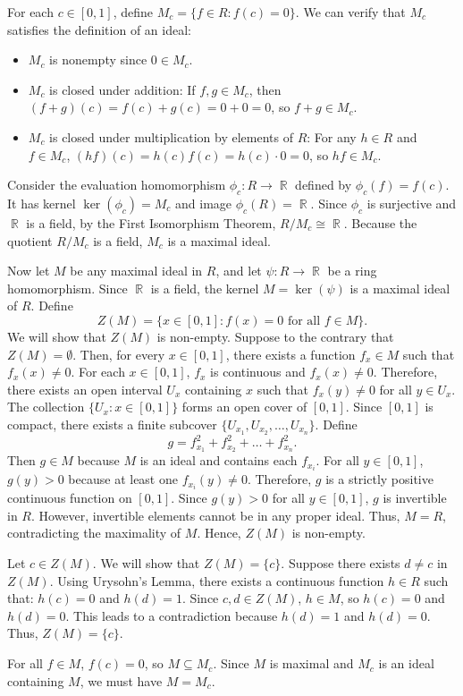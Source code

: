 \documentclass{article}
\DeclareMathOperator{\R}{\mathbb{R}}
\begin{document}
For each \(c\in[0,1]\), define \(M_c=\{f\in R: f(c)= 0\}\). We can verify that \(M_c\) satisfies the definition of an ideal:
\begin{itemize}
    \item \(M_c\) is nonempty since \(0\in M_c\).
    \item \(M_c\) is closed under addition: If \(f,g\in M_c\), then \((f+g)(c)=f(c)+g(c)=0+0=0\), so \(f+g\in M_c\).
    \item \(M_c\) is closed under multiplication by elements of \(R\): For any \(h\in R\) and \(f\in M_c\), \((hf)(c)=h(c)f(c)=h(c)\cdot0=0\), so \(hf\in M_c\).
\end{itemize}

Consider the evaluation homomorphism \(\phi_c:R\to\R\) defined by \(\phi_c(f)= f(c)\). It has kernel \(\ker(\phi_c)=M_c\) and image \(\phi_c(R) = \R\). Since \(\phi_c\) is surjective and \(\R\) is a field, by the First Isomorphism Theorem, \(R/M_c\cong\R\). Because the quotient \(R/M_c\) is a field, \(M_c\) is a maximal ideal.

Now let \(M\) be any maximal ideal in \(R\), and let \(\psi:R\to\R\) be a ring homomorphism. Since \(\R\) is a field, the kernel \(M=\ker(\psi)\) is a maximal ideal of \(R\). Define
\[Z(M)=\{x\in[0,1]:f(x)=0\text{ for all }f\in M\}.\]
We will show that \( Z(M) \) is non-empty. Suppose to the contrary that \(Z(M)=\emptyset\). Then, for every \(x\in[0,1]\), there exists a function \(f_x\in M\) such that \(f_x(x)\neq0\). For each \(x\in[0,1]\), \(f_x\) is continuous and \(f_x(x)\neq0\). Therefore, there exists an open interval \(U_x\) containing \(x\) such that \(f_x(y)\neq0\) for all \(y\in U_x\). The collection \(\{U_x: x\in[0,1]\}\) forms an open cover of \([0,1]\). Since \([0,1]\) is compact, there exists a finite subcover \(\{U_{x_1}, U_{x_2}, \dots, U_{x_n}\}\). Define
\[g = f_{x_1}^2 + f_{x_2}^2 + \dots + f_{x_n}^2.\]
Then \(g\in M\) because \(M\) is an ideal and contains each \(f_{x_i}\). For all \(y\in[0,1]\), \(g(y)>0\) because at least one \(f_{x_i}(y)\neq0\). Therefore, \(g\) is a strictly positive continuous function on \([0,1]\). Since \(g(y)>0 \) for all \(y\in[0,1]\), \(g\) is invertible in \(R\). However, invertible elements cannot be in any proper ideal. Thus, \(M=R\), contradicting the maximality of \(M\). Hence, \(Z(M)\) is non-empty.

Let \(c\in Z(M)\). We will show that \(Z(M)=\{c\}\). Suppose there exists \(d\neq c\) in \(Z(M)\). Using Urysohn's Lemma, there exists a continuous function \(h\in R\) such that: \(h(c)=0\) and \(h(d)=1\). Since \(c,d\in Z(M)\), \(h\in M\), so \(h(c)=0\) and \(h(d)=0\). This leads to a contradiction because \(h(d)=1\) and \(h(d)=0\). Thus, \(Z(M)=\{c\}\).

For all \(f\in M \), \(f(c)=0\), so \( M \subseteq M_c \). Since \( M \) is maximal and \(M_c\) is an ideal containing \(M\), we must have \(M=M_c\).
\end{document}
